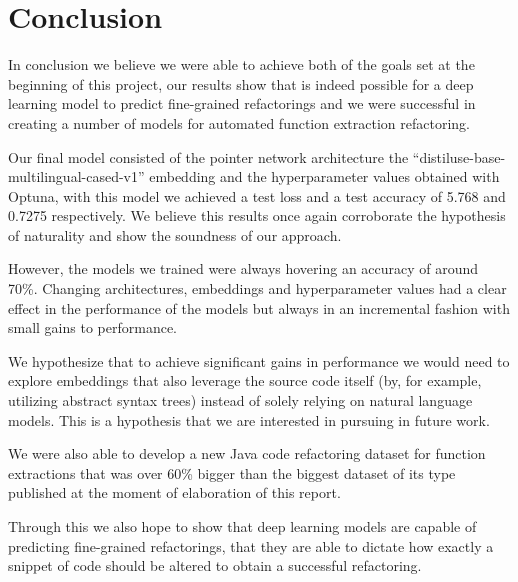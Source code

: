
\chapter{Conclusion}



In conclusion we believe we were able to achieve both of the goals set at the beginning of this project, our results show that is indeed possible for a deep learning model to predict fine-grained refactorings and we were successful in creating a number of models for automated function extraction refactoring. 

Our final model consisted of the pointer network architecture the ``distiluse-base-multilingual-cased-v1'' embedding  and the hyperparameter values obtained with Optuna,  with this model we achieved a test loss and a test accuracy of  5.768 and 0.7275 respectively. We believe this results once again corroborate the hypothesis of naturality and show the soundness of our approach.

However, the models we trained were always hovering an accuracy of around 70\%. Changing architectures, embeddings and hyperparameter values had a clear effect in the performance of the models but always in an incremental fashion with small gains to performance.

We hypothesize that to achieve significant gains in performance we would need to explore embeddings that also leverage the source code itself (by, for example, utilizing abstract syntax trees) instead of solely relying on natural language models. This is a hypothesis that we are interested in pursuing in future work.


We were also able to develop a new Java code refactoring dataset for function extractions that was over 60\% bigger than the biggest dataset of its type published at the moment of elaboration of this report.


Through this we also hope to show that deep learning models are capable of predicting fine-grained refactorings, that they are able to dictate how exactly a snippet of code should be altered to obtain a successful refactoring.
